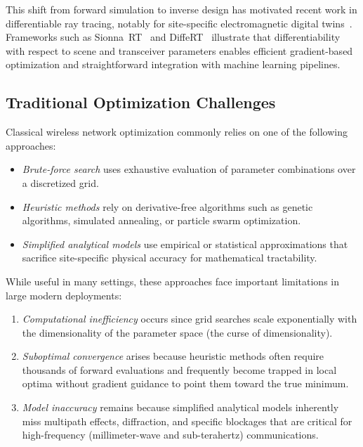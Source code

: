 This shift from forward simulation to inverse design has motivated recent work in differentiable ray tracing, notably for site-specific electromagnetic digital twins~. Frameworks such as Sionna~RT~ and DiffeRT~ illustrate that differentiability with respect to scene and transceiver parameters enables efficient gradient-based optimization and straightforward integration with machine learning pipelines.

\subsection{Traditional Optimization Challenges}

Classical wireless network optimization commonly relies on one of the following approaches:
\begin{itemize}
  \item \emph{Brute-force search} uses exhaustive evaluation of parameter combinations over a discretized grid.
  \item \emph{Heuristic methods} rely on derivative-free algorithms such as genetic algorithms, simulated annealing, or particle swarm optimization.
  \item \emph{Simplified analytical models} use empirical or statistical approximations that sacrifice site-specific physical accuracy for mathematical tractability.
\end{itemize}

While useful in many settings, these approaches face important limitations in large modern deployments:
\begin{enumerate}
  \item \emph{Computational inefficiency} occurs since grid searches scale exponentially with the dimensionality of the parameter space (the curse of dimensionality).
  \item \emph{Suboptimal convergence} arises because heuristic methods often require thousands of forward evaluations and frequently become trapped in local optima without gradient guidance to point them toward the true minimum.
  \item \emph{Model inaccuracy} remains because simplified analytical models inherently miss multipath effects, diffraction, and specific blockages that are critical for high-frequency (millimeter-wave and sub-terahertz) communications.
\end{enumerate}

